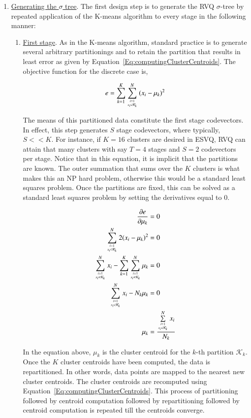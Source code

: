 \begin{enumerate}
\item \underline{Generating the $\sigma$ tree}.  The first design step is to generate the RVQ $\sigma$-tree by repeated application of the K-means algorithm to every stage in the following manner:  
\begin{enumerate}
\item \underline{First stage}. As in the K-means algorithm, standard practice is to generate several arbitrary partitionings and to retain the partition that results in least error as given by Equation~\ref{Eq:computingClusterCentroids}.  The objective function for the discrete case is,

\begin{equation}
\label{Eq:KmeansError}
e = \sum\limits_{k=1}^K \sum\limits_{{i=1 \atop x_i \in \mathcal{K}_k}}^N {(x_i - \mu_k)}^2
\end{equation}

The means of this partitioned data constitute the first stage codevectors.  In effect, this step generates $S$ stage codevectors, where typically, $S << K$.  For instance, if $K=16$ clusters are desired in ESVQ, RVQ can attain that many clusters with say $T=4$ stages and $S=2$ codevectors per stage.  Notice that in this equation, it is implicit that the partitions are known.  The outer summation that sums over the $K$ clusters is what makes this an NP hard problem, otherwise this would be a standard least squares problem.  Once the partitions are fixed, this can be solved as a standard least squares problem by setting the derivatives equal to 0.  

\begin{align}
\frac{\partial{e}}{\partial{\mu_k}} &= 0\notag\\
\sum\limits_{{i=1 \atop x_i \in \mathcal{K}_k}}^N 2 {(x_i - \mu_k)}^2 &= 0\notag\\
\sum\limits_{{i=1 \atop x_i \in \mathcal{K}_k}}^N x_i - \sum\limits_{k=1}^K \sum\limits_{{i=1 \atop x_i \in \mathcal{K}_k}}^N \mu_k &= 0\notag\\
\sum\limits_{{i=1 \atop x_i \in \mathcal{K}_k}}^N x_i - N_k \mu_k &= 0\notag\\
\mu_k &= \frac{\sum\limits_{{i=1 \atop x_i \in \mathcal{K}_k}}^N x_i}{N_k}
\label{Eq:computingClusterCentroids}
\end{align}

In the equation above, $\mu_k$ is the cluster centroid for the $k$-th partition $\mathcal{K}_k$.  Once the $K$ cluster centroids have been computed, the data is repartitioned.  In other words, data points are mapped to the nearest new cluster centroids.  The cluster centroids are recomputed using Equation~\ref{Eq:computingClusterCentroids}.  This process of partitioning followed by centroid computation followed by repartitioning followed by centroid computation is repeated till the centroids converge.


\end{enumerate}
\end{enumerate}
